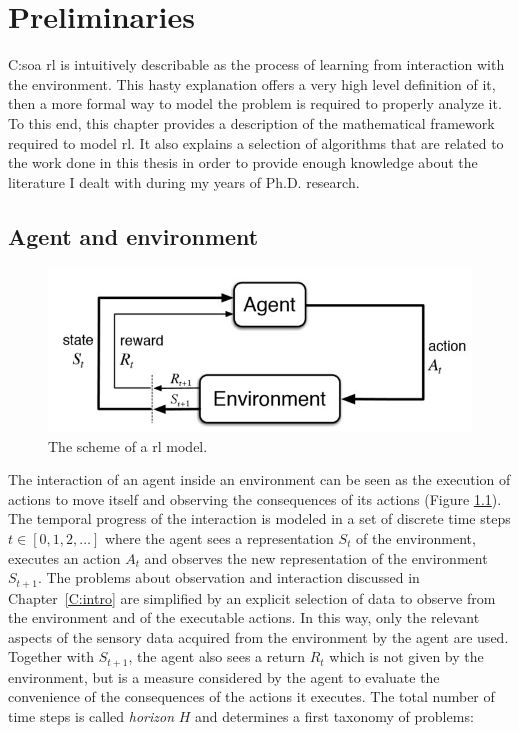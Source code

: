 \chapter{Preliminaries}{C:soa}
\gls{rl} is intuitively describable as the process of learning from interaction with the environment. This hasty explanation offers a very high level definition of it, then a more formal way to model the problem is required to properly analyze it. To this end, this chapter provides a description of the mathematical framework required to model \gls{rl}. It also explains a selection of algorithms that are related to the work done in this thesis in order to provide enough knowledge about the literature I dealt with during my years of Ph.D. research.

\section{Agent and environment}
\begin{figure}[b]
\begin{minipage}{\textwidth}
\begin{center}
  \includegraphics[scale=.75]{img/mdp1.jpg}
\end{center}
\end{minipage}
\caption[Reinforcement Learning problem scheme]{The scheme of a \gls{rl} model.}\label{F:mdp1}
\end{figure}
The interaction of an agent inside an environment can be seen as the execution of actions to move itself and observing the consequences of its actions (Figure \ref{F:mdp1}). The temporal progress of the interaction is modeled in a set of discrete time steps $t \in [0, 1, 2, \dots]$ where the agent sees a representation $S_t$ of the environment, executes an action $A_t$ and observes the new representation of the environment $S_{t+1}$. The problems about observation and interaction discussed in Chapter~\ref{C:intro} are simplified by an explicit selection of data to observe from the environment and of the executable actions. In this way, only the relevant aspects of the sensory data acquired from the environment by the agent are used. Together with $S_{t+1}$, the agent also sees a return $R_t$ which is not given by the environment, but is a measure considered by the agent to evaluate the convenience of the consequences of the actions it executes. The total number of time steps is called \textit{horizon} $H$ and determines a first taxonomy of problems:
